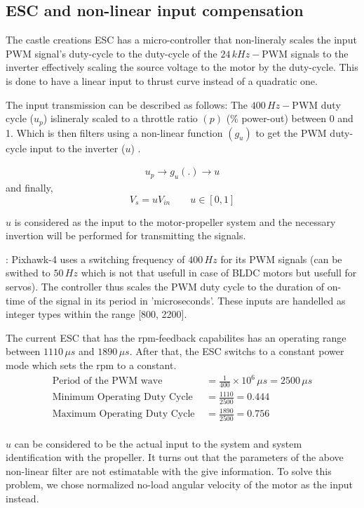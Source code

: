 \subsection{ESC and non-linear input compensation}

The castle creations ESC has a micro-controller that non-lineraly scales the input PWM signal's duty-cycle to the duty-cycle of the $24\,kHz -$PWM signals to the inverter effectively scaling the source voltage to the motor by the duty-cycle. This is done to have a linear input to thrust curve instead of a quadratic one.

The input transmission can be described as follows: The $400\,Hz-$PWM duty cycle ($u_p$) islineraly scaled to a throttle ratio $(p)$ ($\%$ power-out) between 0 and 1. Which is then filters using a non-linear function $(g_u)$ to get the PWM duty-cycle input to the inverter ($u$) \cite{kim2017electric}.

\begin{align*}
    u_p \rightarrow \boxed{g_u(.)} \rightarrow u
\end{align*}
and finally,
$$V_s = u V_{in} \qquad u \in [0, 1]$$

$u$ is considered as the input to the motor-propeller system and the necessary invertion will be performed for transmitting the signals.

:
Pixhawk-4 uses a switching frequency of $400\,Hz$ for its PWM signals (can be swithed to $50 \, Hz$ which is not that usefull in case of BLDC motors but usefull for servos). The controller thus scales the PWM duty cycle to the duration of on-time of the signal in its period in 'microseconds'. These inputs are handelled as integer types within the range [800, 2200]\cite{px4_pwm}.

The current ESC that has the rpm-feedback capabilites has an operating range between $1110 \, \mu s$ and $1890 \, \mu s$. After that, the ESC switchs to a constant power mode which sets the rpm to a constant.
\begin{align*}
    \text{Period of the PWM wave } &= \frac{1}{400} \times 10^6 \, \mu s = 2500 \, \mu s\\
    \text{Minimum Operating Duty Cycle } &= \frac{1110}{2500} = 0.444\\
    \text{Maximum Operating Duty Cycle } &= \frac{1890}{2500} = 0.756\\
\end{align*}

$u$ can be considered to be the actual input to the system and system identification with the propeller. It turns out that the parameters of the above non-linear filter are not estimatable with the give information. To solve this problem, we chose normalized no-load angular velocity of the motor as the input instead.
